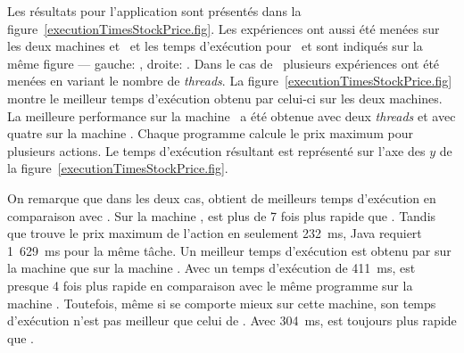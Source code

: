 %
%


Les r\'esultats  pour l'application  sont pr\'esent\'es dans la figure~\ref{executionTimesStockPrice.fig}. Les expériences ont aussi \'et\'e menées sur les deux machines  et~ et les temps d'ex\'ecution pour \ppff\ et  sont indiqu\'es sur la m\^eme figure --- gauche: , droite: . 
%
Dans le cas de \ppff\, plusieurs exp\'eriences ont \'et\'e men\'ees en variant le nombre de \emph{threads}. La figure~\ref{executionTimesStockPrice.fig} montre le meilleur temps d'ex\'ecution obtenu par celui-ci sur les deux machines. La meilleure performance sur la machine \ a \'et\'e obtenue avec deux \emph{threads} et avec quatre sur la machine .
%
Chaque programme calcule le prix maximum pour plusieurs actions. Le temps d'ex\'ecution r\'esultant est repr\'esent\'e sur l'axe des $y$ de la figure~\ref{executionTimesStockPrice.fig}. 

On remarque que dans les deux cas,  obtient de meilleurs temps d'ex\'ecution en comparaison avec . Sur la machine ,  est plus de 7 fois plus rapide que . Tandis que  trouve le prix maximum de l'action en seulement 232~ms, Java requiert 1~629~ms pour la m\^eme t\^ache. Un meilleur temps d'ex\'ecution est obtenu par  sur la machine  que sur la machine . Avec un temps d'ex\'ecution de 411~ms,  est presque 4 fois plus rapide en comparaison avec le m\^eme programme  sur la machine . Toutefois, m\^eme si  se comporte mieux sur cette machine, son temps d'ex\'ecution n'est pas meilleur que celui de . Avec 304~ms,  est toujours plus rapide que . 





